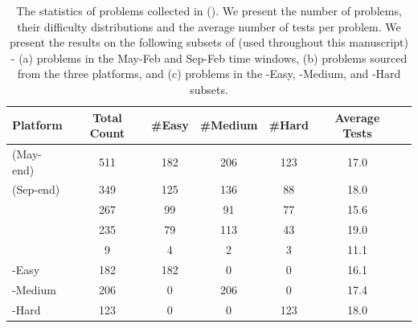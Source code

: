 \begin{table}[!b]
    \centering
    \begin{tabular}{lcccccc}
    \hline
    Platform & Total Count & \#Easy & \#Medium & \#Hard & Average Tests \\
    \hline
    \lcb{} (May-end) & 511 & 182 & 206 & 123 & 17.0 \\
    \lcb{} (Sep-end) & 349 & 125 & 136 & 88 & 18.0 \\
    \hdashline
    \atcoder{} & 267 & 99 & 91 & 77 & 15.6 \\
    \leetcode{} & 235 & 79 & 113 & 43 & 19.0 \\
    \codeforces{} & 9 & 4 & 2 & 3 & 11.1 \\
    \hdashline
    \lcb{}-Easy & 182 & 182 & 0 & 0 & 16.1 \\
    \lcb{}-Medium & 206 & 0 & 206 & 0 & 17.4 \\
    \lcb{}-Hard & 123 & 0 & 0 & 123 & 18.0 \\
    \hline
\end{tabular}
    \caption{
        The statistics of problems collected in \livecodebench{} (\lcb{}). 
        We present the number of problems, their difficulty distributions and the average number of tests per problem.
        We present the results on the following subsets of \livecodebench{} (used throughout this manuscript) - (a) problems in the  May-Feb and Sep-Feb time windows, (b) problems sourced from the three platforms, and (c) problems in the \lcb{}-Easy, \lcb{}-Medium, and \lcb{}-Hard subsets.}
        \label{tab:platform_comparison}
\end{table}
